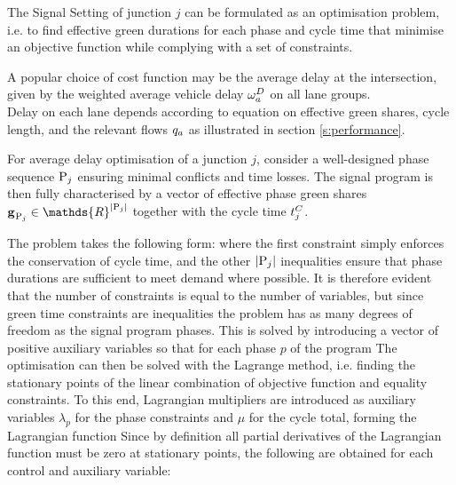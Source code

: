 The Signal Setting of junction $j$ can be formulated as an optimisation problem, i.e. to find
effective green durations for each phase and cycle time that minimise an objective function while complying with a set of constraints.

A popular choice of cost function may be the average delay at the intersection, given by the weighted average vehicle delay $\omega_{a}^{D}$ on all lane groups.\\Delay on each lane depends according to equation  on effective green shares, cycle length, and the relevant flows $q_a$ as illustrated in section \ref{s:performance}.

For average delay optimisation of a junction $j$, consider a well-designed phase sequence $\mathrm{P}_j$ ensuring minimal conflicts and time losses. The signal program is then fully characterised by a vector of effective phase green shares $\grenvec \in \mathds{R}^{|\phaset_j|}$ together with the cycle time $t_{j}^C$.

The problem takes the following form:
where the first constraint simply enforces the conservation of cycle time, and the other $|\mathrm{P}_j|$ inequalities ensure that phase durations are sufficient to meet demand where possible.
It is therefore evident that the number of constraints is equal to the number of variables, but since green time constraints are inequalities the problem has as many degrees of freedom as the signal program phases. This is solved by introducing a vector of positive auxiliary variables so that for each phase $p$ of the program
The optimisation can then be solved with the Lagrange method, i.e. finding the stationary points of the linear combination of objective function and equality constraints. To this end, Lagrangian multipliers are introduced as auxiliary variables $\lambda_p$ for the phase constraints and $\mu$ for the cycle total, forming the Lagrangian function
Since by definition all partial derivatives of the Lagrangian function must be zero at stationary points, the following are obtained for each control and auxiliary variable:
\newcommand{\dld}[1]{\frac{\partial \mathscr{L}}{\partial #1}}


